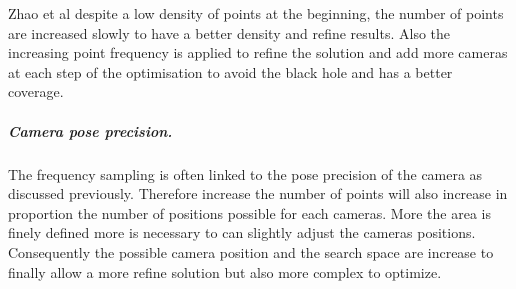 Zhao et al \citep{22*zhao2008}  despite a low density of points at the beginning, the number of points are increased slowly to have a better density and refine results. Also the increasing point frequency   is applied to refine the solution and add more cameras at each step of the optimisation to avoid the black hole and has a better coverage.  \\


\subparagraph{Camera pose precision.}
The frequency sampling is often linked to the pose precision of the camera as discussed previously. %
Therefore increase the number of points will also increase in proportion the number of positions possible for each cameras. More the area is finely defined more is necessary to can slightly adjust the cameras positions. Consequently the possible camera position and the search space are increase to finally allow a more refine solution but also more complex to optimize.


